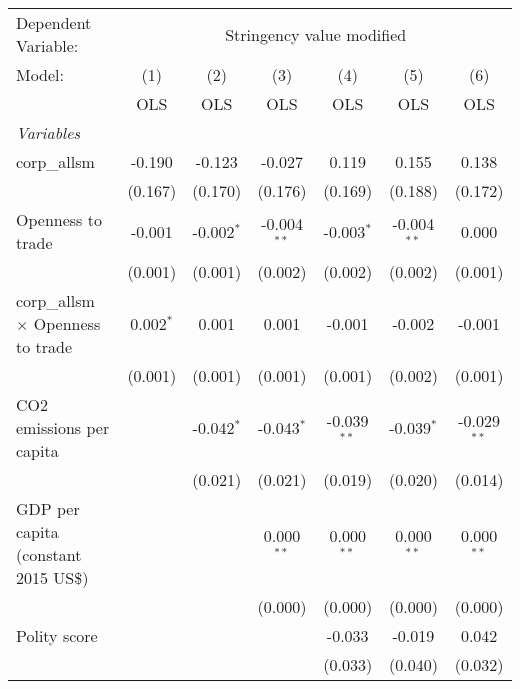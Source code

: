 
\begingroup
\centering
\begin{tabular}{lcccccc}
   \toprule
   Dependent Variable: & \multicolumn{6}{c}{Stringency value modified}\\
   Model:                                   & (1)         & (2)          & (3)           & (4)           & (5)           & (6)\\  
                                            &  OLS        & OLS          & OLS           & OLS           & OLS           & OLS\\  
   \midrule
   \emph{Variables}\\
   corp\_allsm                              & -0.190      & -0.123       & -0.027        & 0.119         & 0.155         & 0.138\\   
                                            & (0.167)     & (0.170)      & (0.176)       & (0.169)       & (0.188)       & (0.172)\\   
   Openness to trade                        & -0.001      & -0.002$^{*}$ & -0.004$^{**}$ & -0.003$^{*}$  & -0.004$^{**}$ & 0.000\\   
                                            & (0.001)     & (0.001)      & (0.002)       & (0.002)       & (0.002)       & (0.001)\\   
   corp\_allsm $\times$ Openness to trade   & 0.002$^{*}$ & 0.001        & 0.001         & -0.001        & -0.002        & -0.001\\   
                                            & (0.001)     & (0.001)      & (0.001)       & (0.001)       & (0.002)       & (0.001)\\   
   CO2 emissions per capita                 &             & -0.042$^{*}$ & -0.043$^{*}$  & -0.039$^{**}$ & -0.039$^{*}$  & -0.029$^{**}$\\   
                                            &             & (0.021)      & (0.021)       & (0.019)       & (0.020)       & (0.014)\\   
   GDP per capita (constant 2015 US\$)      &             &              & 0.000$^{**}$  & 0.000$^{**}$  & 0.000$^{**}$  & 0.000$^{**}$\\   
                                            &             &              & (0.000)       & (0.000)       & (0.000)       & (0.000)\\   
   Polity score                             &             &              &               & -0.033        & -0.019        & 0.042\\   
                                            &             &              &               & (0.033)       & (0.040)       & (0.032)\\   

\end{tabular}
